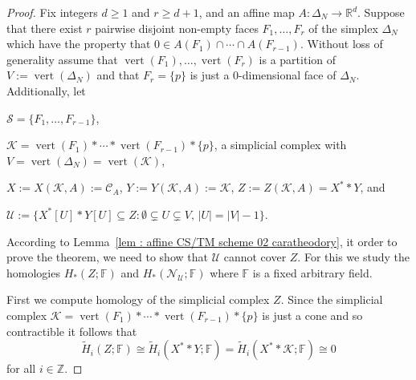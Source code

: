 \documentclass[a4paper,11pt,reqno, english]{amsart}
\theoremstyle{definition}
\theoremstyle{remark}
\newcommand\R{\mathbb R}
\newcommand\Z{\mathbb Z}
\newcommand\FF{\mathbb F}
\newcommand\NN{\mathscr N}
\newcommand\U{\mathscr U}
\newcommand\CC{\mathscr C}
\DeclareMathOperator{\vertex}{\mathrm{vert}}
\begin{document}
\begin{proof}
	Fix integers $d\geq 1$ and $r\geq d+1$, and an affine map $A\colon \Delta_N\longrightarrow\R^d$.
	Suppose that there exist $r$ pairwise disjoint non-empty faces $F_1,\dots, F_{r}$ of the simplex $\Delta_N$ which have the property that
	$
		0\in A(F_1)\cap\cdots\cap A(F_{r-1})
	$.
	Without loss of generality assume that $\vertex(F_1),\dots ,\vertex(F_{r})$ is a partition of $V:=\vertex(\Delta_N)$ and that $F_{r}=\{p\}$ is just a $0$-dimensional face of $\Delta_N$.
	Additionally, let
	\begin{compactitem}[\rm \quad --]
		\item $\mathcal{S}=\{F_1,\dots, F_{r-1}\}$,
		\item $\mathcal{K}=\vertex(F_1)*\cdots*\vertex(F_{r-1})*\{p\}$, a simplicial complex with $V=\vertex(\Delta_N)=\vertex(\mathcal{K})$,
		\item $X:=X(\mathcal{K},A):=\CC_A$, $Y:=Y(\mathcal{K},A):=\mathcal{K}$,   $Z:=Z(\mathcal{K},A)=X^**Y$, and
		\item $\U := \big\{ X^*[U]*Y[U] \subseteq Z : \emptyset\subsetneq U \subsetneq V,\, |U|=|V|-1\big\}$.
	\end{compactitem}
	According to Lemma~\ref{lem : affine CS/TM scheme 02 caratheodory}, it order to prove the theorem, we need to show that $\U$ cannot cover  $Z$.
	For this we study the homologies $H_{*}(Z;\FF)$ and $H_*(\NN_{\U};\FF)$  where $\FF$ is a fixed arbitrary field.


	\medskip
	First we compute homology of the simplicial complex $Z$.
	Since the simplicial complex $\mathcal{K}=\vertex(F_1)*\cdots*\vertex(F_{r-1})*\{p\}$ is just a cone and so contractible it follows that
	\begin{equation}\label{eq:homology_of_Z_caratheodory}
		\widetilde{H}_i(Z;\FF) \cong \widetilde{H}_i(X^**Y;\FF)=\widetilde{H}_i(X^**\mathcal{K};\FF)\cong 0
	\end{equation}
	for all $i\in\Z$.



\end{proof}
\end{document}
